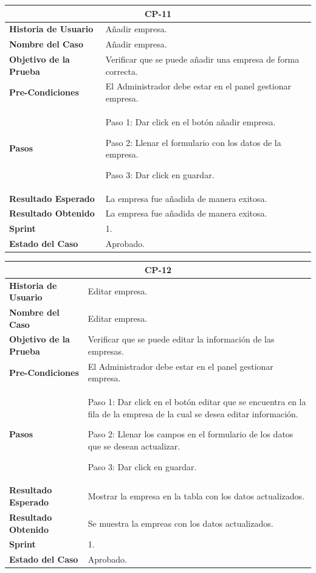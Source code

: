 \documentclass[12pt,a4paper]{article}
\begin{document}
\begin{center}
\begin{tabular}{|m{5cm}|m{9cm}|}
\hline
\multicolumn{2}{|c|}{\textbf{CP-11}} \\
\hline
\textbf{Historia de Usuario} & Añadir empresa. \\
\hline
\textbf{Nombre del Caso} & Añadir empresa. \\
\hline
\textbf{Objetivo de la Prueba} & Verificar que se puede añadir una empresa de forma correcta. \\
\hline
\textbf{Pre-Condiciones} &  El Administrador debe estar en el panel gestionar empresa.\\
\hline
\textbf{Pasos} & Paso 1: Dar click en el botón añadir empresa.

Paso 2: Llenar el formulario con los datos de la empresa.

Paso 3: Dar click en guardar. \\
\hline
\textbf{Resultado Esperado} & La empresa fue añadida de manera exitosa. \\
\hline
\textbf{Resultado Obtenido} & La empresa fue añadida de manera exitosa. \\
\hline
\textbf{Sprint} & 1. \\
\hline
\textbf{Estado del Caso} & Aprobado. \\
\hline
\end{tabular}
\vspace{5mm}

\begin{tabular}{|m{5cm}|m{9cm}|}
\hline
\multicolumn{2}{|c|}{\textbf{CP-12}} \\
\hline
\textbf{Historia de Usuario} & Editar empresa. \\
\hline
\textbf{Nombre del Caso} & Editar empresa. \\
\hline
\textbf{Objetivo de la Prueba} & Verificar que se puede editar la información de las empresas. \\
\hline
\textbf{Pre-Condiciones} & El Administrador debe estar en el panel gestionar empresa. \\
\hline
\textbf{Pasos} & Paso 1: Dar click en el botón editar que se encuentra en la fila de la empresa de la cual se desea editar información.

Paso 2: Llenar los campos en el formulario de los datos que se desean actualizar.

Paso 3: Dar click en guardar.\\
\hline
\textbf{Resultado Esperado} & Mostrar la empresa en la tabla con los datos actualizados. \\
\hline
\textbf{Resultado Obtenido} & Se muestra la empreas con los datos actualizados. \\
\hline
\textbf{Sprint} & 1. \\
\hline
\textbf{Estado del Caso} & Aprobado. \\
\hline
\end{tabular}
\vspace{5mm}


\end{center}
\end{document}
